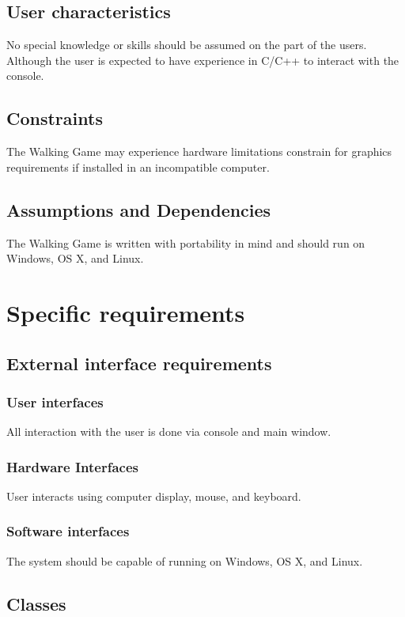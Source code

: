 \documentclass[12pt]{article}
\begin{document}
	\subsection{User characteristics}
	No special knowledge or skills should be assumed on the part of the users. Although the user is expected to have experience in C/C++ to interact with the console. 
	
	\subsection{Constraints}
	The Walking Game may experience hardware limitations constrain for graphics requirements if installed in an incompatible computer.
	
	\subsection{Assumptions and Dependencies}
	The Walking Game is written with portability in mind and should run on Windows, OS X, and Linux.
	
	\clearpage
	
	\section{Specific requirements}
	\subsection{External interface requirements}
	\subsubsection{User interfaces}
	All interaction with the user is done via console and main window.
	
	\subsubsection{Hardware Interfaces}
	User interacts using computer display, mouse, and keyboard.
	
	\subsubsection{Software interfaces}
	The system should be capable of running on Windows, OS X, and Linux.
	
	\subsection{Classes}
	
\end{document}
